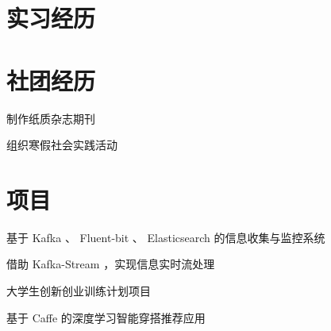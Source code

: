 \documentclass[]{deedy-resume-openfont}
\begin{document}
\begin{minipage}[t]{0.68\textwidth} 


\section{实习经历}
\sectionsep


\sectionsep

\section{社团经历}
\sectionsep

\vspace{\topsep}
\begin{tightemize}
    \item 制作纸质杂志期刊
\end{tightemize}

\sectionsep

\begin{tightemize}
    \item 组织寒假社会实践活动
\end{tightemize}

\sectionsep


\section{项目}
\sectionsep

\begin{tightemize}
    \item 基于 Kafka 、 Fluent-bit 、 Elasticsearch 的信息收集与监控系统
    \item 借助 Kafka-Stream ，实现信息实时流处理
\end{tightemize}
\sectionsep

\begin{tightemize}
    \item 大学生创新创业训练计划项目
    \item 基于 Caffe 的深度学习智能穿搭推荐应用
\end{tightemize}


\end{minipage}
\end{document}
